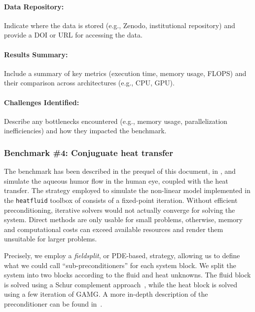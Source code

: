 \paragraph{Data Repository:} Indicate where the data is stored (e.g., Zenodo, institutional repository) and provide a DOI or URL for accessing the data.

\paragraph{Results Summary:} Include a summary of key metrics (execution time, memory usage, FLOPS) and their comparison across architectures (e.g., CPU, GPU).

\paragraph{Challenges Identified:} Describe any bottlenecks encountered (e.g., memory usage, parallelization inefficiencies) and how they impacted the benchmark.

\fi

\subsubsection{Benchmark \#4: Conjuguate heat transfer}
\label{sec:WP3:Feelpp:benchmark4}


The benchmark has been described in the prequel of this document, in , and simulate the aqueous humor flow in the human eye, coupled with the heat transfer.
The strategy employed to simulate the non-linear model implemented in the \texttt{heatfluid} toolbox of \Feelpp consists of a fixed-point iteration.
Without efficient preconditioning, iterative solvers would not actually converge for solving the system.
Direct methods are only usable for small problems, otherwise, memory and computational costs can exceed available resources and render them unsuitable for larger problems.

Precisely, we employ a \emph{fieldsplit}, or PDE-based, strategy, allowing us to define what we could call ``sub-preconditioners'' for each system block.
We split the system into two blocks according to the fluid and heat unknowns.
The fluid block is solved using a Schur complement approach~\cite{elman_finite_2014}, while the heat block is solved using a few iteration of GAMG.
%
A more in-depth description of the preconditioner can be found in~\cite{saigre_coupled_2024_paper}.


